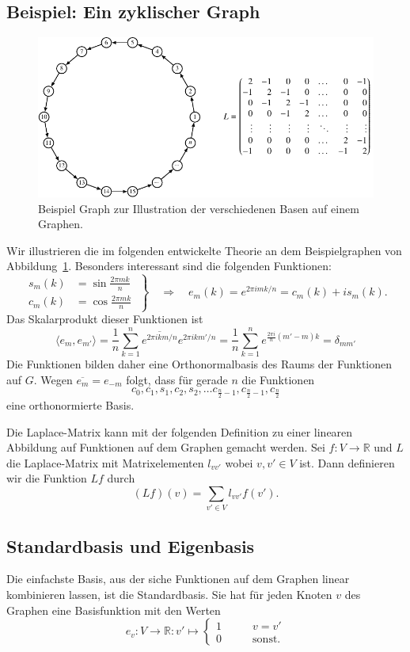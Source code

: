 \subsection{Beispiel: Ein zyklischer Graph}
\begin{figure}
\centering
\includegraphics{chapters/70-graphen/images/kreis.pdf}
\caption{Beispiel Graph zur Illustration der verschiedenen Basen auf einem
Graphen.
\label{buch:graphen:fig:kreis}}
\end{figure}
Wir illustrieren die im folgenden entwickelte Theorie an dem Beispielgraphen
von Abbildung~\ref{buch:graphen:fig:kreis}.
Besonders interessant sind die folgenden Funktionen:
\[
\left.
\begin{aligned}
s_m(k)
&=
\sin\frac{2\pi mk}{n}
\\
c_m(k)
&=
\cos\frac{2\pi mk}{n}
\end{aligned}
\;
\right\}
\quad
\Rightarrow
\quad
e_m(k)
=
e^{2\pi imk/n}
=
c_m(k) + is_m(k).
\]
Das Skalarprodukt dieser Funktionen ist
\[
\langle e_m, e_{m'}\rangle
=
\frac1n
\sum_{k=1}^n
\overline{e^{2\pi i km/n}}
e^{2\pi ikm'/n}
=
\frac1n
\sum_{k=1}^n
e^{\frac{2\pi i}{n}(m'-m)k}
=
\delta_{mm'}
\]
Die Funktionen bilden daher eine Orthonormalbasis des Raums der
Funktionen auf $G$.
Wegen $\overline{e_m} = e_{-m}$ folgt, dass für gerade $n$
die Funktionen
\[
c_0, c_1,s_1,c_2,s_2,\dots c_{\frac{n}2-1},c_{\frac{n}2-1},c_{\frac{n}2}
\]
eine orthonormierte Basis.


Die Laplace-Matrix kann mit der folgenden Definition zu einer linearen
Abbildung auf Funktionen auf dem Graphen gemacht werden.
Sei $f\colon V\to \mathbb{R}$ und $L$ die Laplace-Matrix mit
Matrixelementen $l_{vv'}$ wobei $v,v'\in V$ ist.
Dann definieren wir die Funktion $Lf$ durch
\[
(Lf)(v)
=
\sum_{v'\in V} l_{vv'}f(v').
\]

\subsection{Standardbasis und Eigenbasis
\label{buch:subsection:standardbasis-und-eigenbasis}}
Die einfachste Basis, aus der siche Funktionen auf dem Graphen linear
kombinieren lassen, ist die Standardbasis.
Sie hat für jeden Knoten $v$ des Graphen eine Basisfunktion mit den Werten
\[
e_v\colon V\to\mathbb R:v'\mapsto \begin{cases}
1\qquad&v=v'\\
0\qquad&\text{sonst.}
\end{cases}
\]



